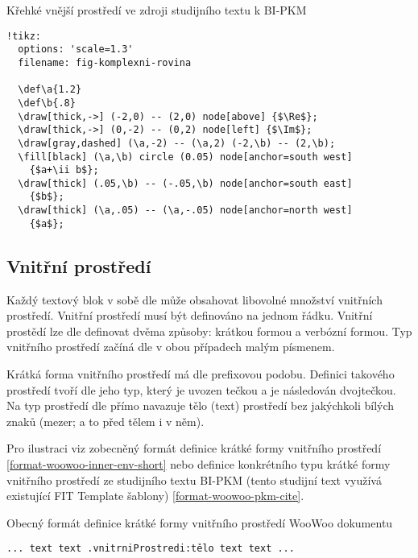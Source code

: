 \begin{listing}
    \caption{Křehké vnější prostředí ve zdroji studijního textu k BI-PKM \cite{pkm}}
    \label{format-woowoo-pkm-tikz}
    \begin{verbatim}
!tikz:
  options: 'scale=1.3'
  filename: fig-komplexni-rovina

  \def\a{1.2}
  \def\b{.8}
  \draw[thick,->] (-2,0) -- (2,0) node[above] {$\Re$};
  \draw[thick,->] (0,-2) -- (0,2) node[left] {$\Im$};
  \draw[gray,dashed] (\a,-2) -- (\a,2) (-2,\b) -- (2,\b);
  \fill[black] (\a,\b) circle (0.05) node[anchor=south west]
    {$a+\ii b$};
  \draw[thick] (.05,\b) -- (-.05,\b) node[anchor=south east]
    {$b$};
  \draw[thick] (\a,.05) -- (\a,-.05) node[anchor=north west]
    {$a$};
    \end{verbatim}
\end{listing}

\subsection{Vnitřní prostředí}

Každý textový blok v sobě dle \cite{woowoo} může obsahovat libovolné množství vnitřních prostředí. Vnitřní prostředí
musí být definováno na jednom řádku. Vnitřní prostědí lze dle \cite{woowoo} definovat dvěma způsoby: krátkou formou a
verbózní formou. Typ vnitřního prostředí začíná dle \cite{woowoo} v obou případech malým písmenem.

Krátká forma vnitřního prostředí má dle \cite{woowoo} prefixovou podobu. Definici takového prostředí tvoří dle
\cite{woowoo} jeho typ, který je uvozen tečkou a je následován dvojtečkou. Na typ prostředí dle \cite{woowoo} přímo
navazuje tělo (text) prostředí bez jakýchkoli bílých znaků (mezer; a to před tělem i v něm).

Pro ilustraci viz zobecněný formát definice krátké formy vnitřního prostředí \ref{format-woowoo-inner-env-short} nebo
definice konkrétního typu krátké formy vnitřního prostředí ze studijního textu BI-PKM (tento studijní text využívá
existující FIT Template šablony) \ref{format-woowoo-pkm-cite}.

\begin{listing}
    \caption{Obecný formát definice krátké formy vnitřního prostředí WooWoo dokumentu}
    \label{format-woowoo-inner-env-short}
    \begin{verbatim}
... text text .vnitrniProstredi:tělo text text ...
    \end{verbatim}
\end{listing}

